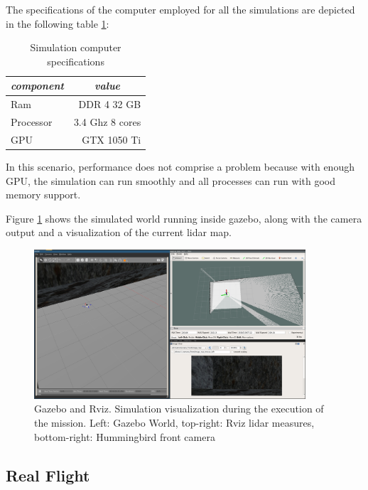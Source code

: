     The specifications of the computer employed for all the simulations are depicted in the following table \ref{ch_5:table:laptop_specs}:

    \begin{table}[!h]
      \centering
      \begin{tabular}{lr} \toprule
        \multicolumn{1}{c}{\textit{component}} & \multicolumn{1}{c}{\textit{value}}   \\ \midrule
        Ram           & DDR 4 32 GB     \\
        Processor     & 3.4 Ghz 8 cores \\
        GPU           & GTX 1050 Ti     \\ \bottomrule
        \hline
      \end{tabular}
      \caption{Simulation computer specifications}
      \label{ch_5:table:laptop_specs}
    \end{table}

    In this scenario, performance does not comprise a problem because with enough GPU, the simulation can run smoothly and all processes can run with good memory support.

    Figure \ref{ch_5:fig:full_sim} shows the simulated world running inside gazebo, along with the camera output and a visualization of the current lidar map.
    
    \begin{figure}
      \centering
      \includegraphics[width=0.9\textwidth,height=0.5\textheight,keepaspectratio]{./Figures/FullSim.png}
      \caption{Gazebo and Rviz. Simulation visualization during the execution of the mission. Left: Gazebo World, top-right: Rviz lidar measures, bottom-right: Hummingbird front camera}
      \label{ch_5:fig:full_sim}
    \end{figure}

  \subsection{Real Flight} \label{ch_5:subsect:exp_real_flight}

